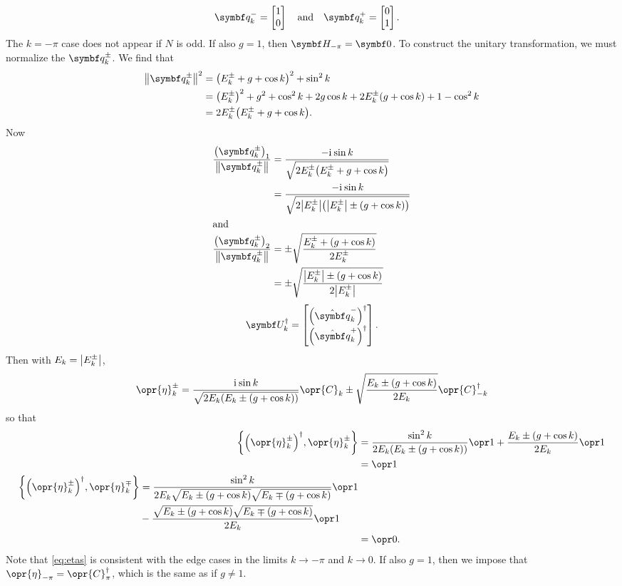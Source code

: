 \documentclass[../thesis.tex]{subfiles}
\begin{document}
\begin{align}
  \vq{q}_k^-
  &= \bmqty{1 \\ 0}
  \qand
  \vq{q}_k^+
  = \bmqty{0 \\ 1}.
\end{align}
The $k = -\pi$ case does not appear if $N$ is odd. If also $g =
1$, then $\mq{H}_{-\pi} = \mq{0}$.
To construct the unitary
transformation, we must normalize the $\vq{q}_k^\pm$. We find that
\begin{align}
  \norm{\vq{q}_k^\pm}^2
  &= {\qty(E_k^\pm + g + \cos k)}^2 + \sin^2 k \\
  &= {\qty(E_k^\pm)}^2 + g^2 + \cos^2 k + 2g\cos k + 2E_k^\pm(g + \cos k) + 1 - \cos^2 k \\
  &= 2E_k^\pm \qty(E_k^\pm + g + \cos k).
\end{align}
Now
\begin{align}
  \frac{{\qty(\vq{q}_k^\pm)}_1}{\norm{\vq{q}_k^\pm}}
  &= \frac{-\im\sin k}{\sqrt{2E_k^\pm \qty(E_k^\pm + g + \cos k)}} \\
  &= \frac{-\im\sin k}{\sqrt{2\abs{E_k^\pm} \qty(\abs{E_k^\pm} \pm (g + \cos k))}}
  \\
  \shortintertext{and}
  \frac{{\qty(\vq{q}_k^\pm)}_2}{\norm{\vq{q}_k^\pm}}
  &= \pm\sqrt{\frac{E_k^\pm + (g + \cos k)}{2E_k^\pm}} \\
  &= \pm\sqrt{\frac{\abs{E_k^\pm} \pm (g + \cos k)}{2\abs{E_k^\pm}}}
\end{align}
\begin{equation}
  \mq{U}_k^\dag
  = \bmqty{%
    {\qty(\hat{\vq{q}}_k^-)}^\dag \\
    {\qty(\hat{\vq{q}}_k^+)}^\dag
  }.
\end{equation}
Then with $E_k = \abs{E_k^\pm}$,
\begin{equation}
  \opr{\eta}_k^\pm
  = \frac{\im\sin k}{\sqrt{2E_k\qty(E_k \pm (g + \cos k))}}
  \opr{C}_k
  \pm \sqrt{\frac{E_k \pm (g + \cos k)}{2E_k}}
  \opr{C}^\dag_{-k}
  \label{eq:etas}
\end{equation}
so that
\begin{align}
  \acomm{{\qty(\opr{\eta}_k^\pm)}^\dag}{\opr{\eta}_k^\pm}
  &= \frac{\sin^2 k}{2E_k\qty(E_k \pm (g + \cos k))} \idopr
  + \frac{E_k \pm (g + \cos k)}{2E_k} \idopr \\
  &= \idopr
  \\
  \begin{split}
  \acomm{{\qty(\opr{\eta}_k^\pm)}^\dag}{\opr{\eta}_k^\mp}
  &= \frac{\sin^2 k}{2E_k
    \sqrt{E_k \pm (g + \cos k)}
  \sqrt{E_k \mp (g + \cos k)}} \idopr \\
  &- \frac{\sqrt{E_k \pm (g + \cos k)}\sqrt{E_k \mp (g + \cos k)}}{%
  2 E_k} \idopr
  \end{split}
  \\
  &= \zopr.
\end{align}
Note that \cref{eq:etas} is consistent with the edge cases in the limits $k \to
-\pi$ and $k \to 0$. If also $g = 1$, then we impose that $\opr{\eta}_{-\pi} =
\opr{C}_\pi^\dag$, which is the same as if $g \ne 1$.
\end{document}
